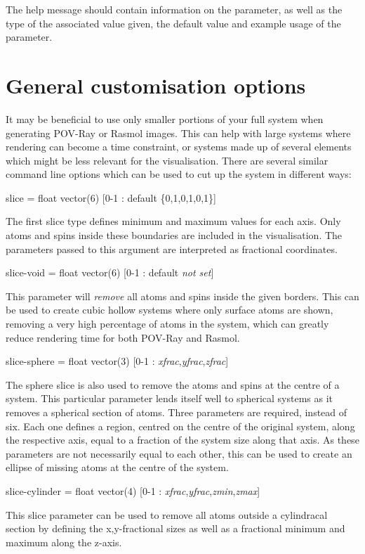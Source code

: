 The help message should contain information on the parameter, as well as the
type of the associated value given, the default value and example usage of the
parameter.

\section*{General customisation options}

It may be beneficial to use only smaller portions of your full system when
generating POV-Ray or Rasmol images. This can help with large systems where
rendering can become a time constraint, or systems made up of several elements
which might be less relevant for the visualisation. There are several similar
command line options which can be used to cut up the system in different ways:

{\zicf slice = float vector(6) [0-1 : default \{0,1,0,1,0,1\}]}
 The first slice type
defines minimum and maximum values for each axis. Only atoms and spins inside
these boundaries are included in the visualisation. The parameters passed to
this argument are interpreted as fractional coordinates.

{\zicf slice-void = float vector(6) [0-1 : default \textit{not set}]}
 This parameter will
\textit{remove} all atoms and spins inside the given borders. This can be used
to create cubic hollow systems where only surface atoms are shown,  removing a
very high percentage of atoms in the system, which can greatly reduce rendering
time for both POV-Ray and Rasmol.

{\zicf slice-sphere = float vector(3) [0-1 : \textit{xfrac},\textit{yfrac},\textit{zfrac}]}
 The sphere slice
is also used to remove the atoms and spins at the centre of a system. This
particular parameter lends itself well to spherical systems as it removes a
spherical section of atoms. Three parameters are required, instead of six. Each
one defines a region, centred on the centre of the original system, along the
respective axis, equal to a fraction of the system size along that axis. As
these parameters are not necessarily equal to each other, this can be used to
create an ellipse of missing atoms at the centre of the system.

{\zicf slice-cylinder = float vector(4) [0-1 : \textit{xfrac},\textit{yfrac},\textit{zmin},\textit{zmax}]}
 This slice
parameter can be used to remove all atoms outside a cylindracal section by
defining the x,y-fractional sizes as well as a fractional minimum and maximum
along the z-axis.

